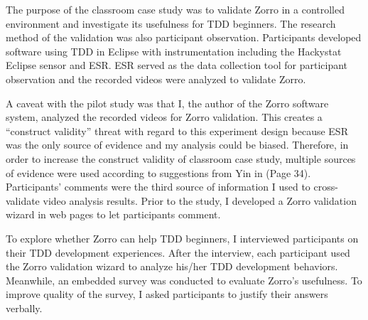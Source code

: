 The purpose of the classroom case study was to validate Zorro in a controlled environment and investigate its usefulness for TDD beginners. The research method of the validation was also participant observation. Participants developed software using TDD in Eclipse with instrumentation including the Hackystat Eclipse sensor and ESR. ESR served as the data collection tool for participant observation and the recorded videos were analyzed to validate Zorro.

A caveat with the pilot study was that I, the author of the Zorro software system, analyzed the recorded videos for Zorro validation. This creates a ``construct validity'' threat with regard to this experiment design because ESR was the only source of evidence and my analysis could be biased. Therefore, in order to increase the construct validity of classroom case study, multiple sources of evidence were used according to suggestions from Yin in \cite{Yin:03} (Page 34). Participants' comments were the third source of information I used to cross-validate video analysis results. Prior to the study, I developed a Zorro validation wizard in web pages to let participants comment. 

To explore whether Zorro can help TDD beginners, I interviewed participants on their TDD development experiences. After the interview, each participant used the Zorro validation wizard to analyze his/her TDD development behaviors. Meanwhile, an embedded survey was conducted to evaluate Zorro's usefulness. To improve quality of the survey, I asked participants to justify their answers verbally. 


